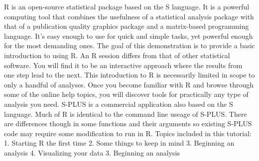 \documentclass[a4paper,12pt]{article}
\begin{document}

R is an open-source statistical package based on the S language. It is a powerful computing tool that combines the usefulness of a statistical analysis package with that of a publication quality graphics package and a matrix-based programming language. It's easy enough to use for quick and simple tasks, yet powerful enough for the most demanding ones. The goal of this demonstration is to provide a basic introduction to using R. An R session differs from that of other statistical software. You will find it to be an interactive approach where the results from one step lead to the next. This introduction to R is necessarily limited in scope to only a handful of analyses. Once you become familiar with R and browse through some of the online help topics, you will discover tools for practically any type of analysis you need. S-PLUS is a commercial application also based on the S language. Much of R is identical to the command line useage of S-PLUS. There are differences though in some functions and their arguments so existing S-PLUS code may require some modification to run in R. 
Topics included in this tutorial: 
1. Starting R the first time
2. Some things to keep in mind
3. Beginning an analysis
4. Visualizing your data
3. Beginning an analysis
\end{document}
